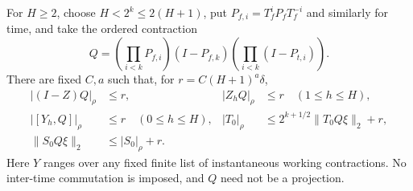 \begin{proposition}\label{prop:power-localization}
For $H\ge2$, choose $H<2^k\le2(H+1)$, put $P_{f,i}=T_f^iP_fT_f^{-i}$ and similarly for time, and take the ordered contraction
\[
 Q=\left(\prod_{i<k}P_{f,i}\right)(I-P_{f,k})\left(\prod_{i<k}(I-P_{t,i})\right).
\]
There are fixed $C,a$ such that, for $r=C(H+1)^a\delta$,
\begin{align*}
 |(I-Z)Q|_\rho&\le r,& |Z_hQ|_\rho&\le r\quad(1\le h\le H),\\
 |[Y_h,Q]|_\rho&\le r\quad(0\le h\le H),&
 |T_0|_\rho&\le2^{k+1/2}\|T_0Q\xi\|_2+r,\\
 \|S_0Q\xi\|_2&\le|S_0|_\rho+r.
\end{align*}
Here $Y$ ranges over any fixed finite list of instantaneous working contractions. No inter-time commutation is imposed, and $Q$ need not be a projection.
\end{proposition}
